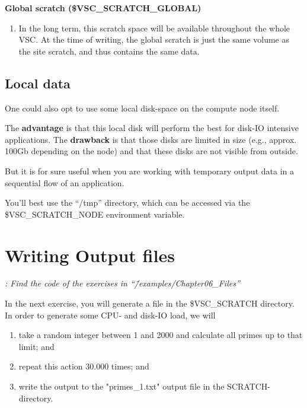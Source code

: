 \textbf{Global scratch (\$VSC\_SCRATCH\_GLOBAL)}
\begin{enumerate}
\item \textbf{ }In the long term, this scratch space will be available throughout the whole VSC. At the time of writing, the global scratch is just the same volume as the site scratch, and thus contains the same data.
\end{enumerate}

\subsection{Local data}

One could also opt to use some local disk-space on the compute node itself.

The \textbf{advantage} is that this local disk will perform the best for disk-IO intensive applications.  The \textbf{drawback} is that those disks are limited in size (e.g., approx. 100Gb depending on the node) and that these disks are not visible from outside.

But it is for sure useful when you are working with temporary output data in a sequential flow of an application.

You'll best use the ``/tmp'' directory, which can be accessed via the \$VSC\_SCRATCH\_NODE environment variable.


\section{Writing Output files}

\textit{: Find the code of the exercises in ``\~/examples/Chapter06\_Files''}

In the next exercise, you will generate a file in the \$VSC\_SCRATCH directory.
In order to generate some CPU- and disk-IO load, we will
\begin{enumerate}
\item  take a random integer between 1 and 2000 and calculate all primes up to that limit; and
\item  repeat this action 30.000 times; and
\item  write the output to the "primes\_1.txt" output file in the SCRATCH-directory.
\end{enumerate}

